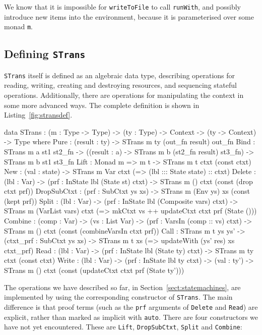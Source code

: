 We know that it is impossible for \texttt{writeToFile} to call
\texttt{runWith}, and possibly introduce new items into the environment,
because it is parameterised over some monad \texttt{m}.

\subsection{Defining \texttt{STrans}}

\texttt{STrans} itself is defined as an algebraic data type, describing
operations for reading, writing, creating and destroying resources,
and sequencing stateful operations. Additionally, there are operations for
manipulating the context in some more advanced ways. The complete definition
is shown in Listing~\ref{fig:stransdef}.

\small
\begin{code}[float=h, frame=single,caption={The complete definition of
\texttt{STrans} as an Idris data type},label=fig:stransdef]
data STrans : (m : Type -> Type) -> (ty : Type) -> 
              Context -> (ty -> Context) -> Type where
     Pure : (result : ty) -> STrans m ty (out_fn result) out_fn
     Bind : STrans m a st1 st2_fn ->
            ((result : a) -> STrans m b (st2_fn result) st3_fn) ->
            STrans m b st1 st3_fn
     Lift : Monad m => m t -> STrans m t ctxt (const ctxt)
     New : (val : state) -> 
           STrans m Var ctxt (\lbl => (lbl ::: State state) :: ctxt)
     Delete : (lbl : Var) -> (prf : InState lbl (State st) ctxt) ->
              STrans m () ctxt (const (drop ctxt prf))
     DropSubCtxt : (prf : SubCtxt ys xs) -> STrans m (Env ys) xs (const (kept prf))
     Split : (lbl : Var) -> (prf : InState lbl (Composite vars) ctxt) ->
             STrans m (VarList vars) ctxt 
                   (\vs => mkCtxt vs ++ updateCtxt ctxt prf (State ()))
     Combine : (comp : Var) -> (vs : List Var) ->
               (prf : VarsIn (comp :: vs) ctxt) ->
               STrans m () ctxt (const (combineVarsIn ctxt prf))
     Call : STrans m t ys ys' -> (ctxt_prf : SubCtxt ys xs) ->
            STrans m t xs (\res => updateWith (ys' res) xs ctxt_prf)
     Read : (lbl : Var) -> (prf : InState lbl (State ty) ctxt) ->
            STrans m ty ctxt (const ctxt)
     Write : (lbl : Var) -> (prf : InState lbl ty ctxt) -> (val : ty') ->
             STrans m () ctxt (const (updateCtxt ctxt prf (State ty')))
\end{code}
\normalsize

The operations we have described so far, in Section~\ref{sect:statemachines},
are implemented by using the corresponding constructor of \texttt{STrans}.
The main difference is that proof terms (such as the \texttt{prf} arguments
of \texttt{Delete} and \texttt{Read}) are explicit, rather than marked
as implicit with \texttt{auto}.
%
There are four constructors we have not yet encountered. These are
\texttt{Lift}, \texttt{DropSubCtxt}, \texttt{Split} and \texttt{Combine}:


